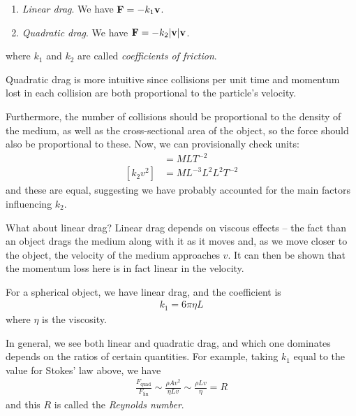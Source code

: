 \documentclass{../template/note}
\begin{document}
    \begin{enumerate}[label=\protect\circled{\arabic*}]
        \item \emph{Linear drag}. We have \(\V F = -k_1 \V v\).
        \item \emph{Quadratic drag}. We have \(\V F = -k_2 |\V v| \V v\).
    \end{enumerate}
    where \(k_1\) and \(k_2\) are called \emph{coefficients of friction}.

    Quadratic drag is more intuitive since collisions per unit time and momentum lost in each collision are both proportional to the particle's velocity.

    Furthermore, the number of collisions should be proportional to the density of the medium, as well as the cross-sectional area of the object, so the force should also be proportional to these. Now, we can provisionally check units:
    \begin{align*}
        [F] &= \si{MLT^{-2}} \\
        [k_2v^2] &= \si{ML^{-3}L^2L^2T^{-2}}
    \end{align*}
    and these are equal, suggesting we have probably accounted for the main factors influencing \(k_2\).

    What about linear drag? Linear drag depends on viscous effects -- the fact than an object drags the medium along with it as it moves and, as we move closer to the object, the velocity of the medium approaches \(v\). It can then be shown that the momentum loss here is in fact linear in the velocity.
    
    \begin{example*}
        For a spherical object, we have linear drag, and the coefficient is
        \begin{align*}
            k_1 = 6\pi \eta L
        \end{align*}
        where \(\eta\) is the viscosity.
    \end{example*}
    
    In general, we see both linear and quadratic drag, and which one dominates depends on the ratios of certain quantities. For example, taking \(k_1\) equal to the value for Stokes' law above, we have
    \begin{align*}
        \frac{F_\text{quad}}{F_\text{lin}} \sim \frac{\rho A v^2}{\eta L v} \sim \frac{\rho L v}{\eta} = R
    \end{align*}
    and this \(R\) is called the \emph{Reynolds number}.
\end{document}
